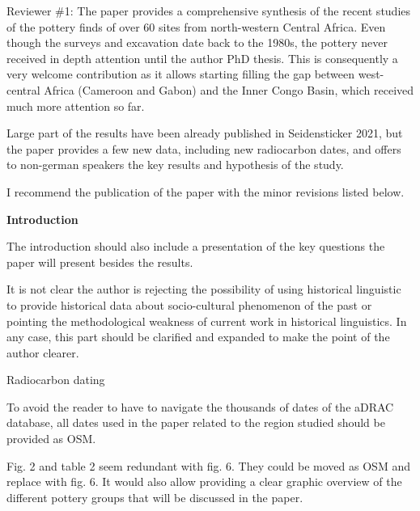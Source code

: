 \newpage
\begin{reviewer}
Reviewer \#1: The paper provides a comprehensive synthesis of the recent studies of the pottery finds of over 60 sites from north-western Central Africa. Even though the surveys and excavation date back to the 1980s, the pottery never received in depth attention until the author PhD thesis. This is consequently a very welcome contribution as it allows starting filling the gap between west-central Africa (Cameroon and Gabon) and the Inner Congo Basin, which received much more attention so far.

Large part of the results have been already published in Seidensticker 2021, but the paper provides a few new data, including new radiocarbon dates, and offers to non-german speakers the key results and hypothesis of the study.

I recommend the publication of the paper with the minor revisions listed below.

\noindent\textbf{Introduction}

\point The introduction should also include a presentation of the key questions the paper will present besides the results.


\point It is not clear the author is rejecting the possibility of using historical linguistic to provide historical data about socio-cultural phenomenon of the past or pointing the methodological weakness of current work in historical linguistics. In any case, this part should be clarified and expanded to make the point of the author clearer.


\point Radiocarbon dating

To avoid the reader to have to navigate the thousands of dates of the aDRAC database, all dates used in the paper related to the region studied should be provided as OSM.


\point Fig. 2 and table 2 seem redundant with fig. 6. They could be moved as OSM and replace with fig. 6. It would also allow providing a clear graphic overview of the different pottery groups that will be discussed in the paper.\label{rev1:bayes}


\end{reviewer}
